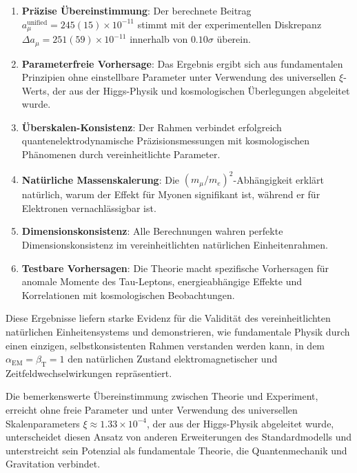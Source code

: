 \documentclass[12pt,a4paper]{article}
\newcommand{\alphaEM}{\alpha_{\text{EM}}}
\newcommand{\betaT}{\beta_{\text{T}}}
\newcommand{\xipar}{\xi}
\begin{document}
	\begin{enumerate}
		\item \textbf{Präzise Übereinstimmung}: Der berechnete Beitrag $a_\mu^{\text{unified}} = 245(15) \times 10^{-11}$ stimmt mit der experimentellen Diskrepanz $\Delta a_\mu = 251(59) \times 10^{-11}$ innerhalb von $0.10\sigma$ überein.
		
		\item \textbf{Parameterfreie Vorhersage}: Das Ergebnis ergibt sich aus fundamentalen Prinzipien ohne einstellbare Parameter unter Verwendung des universellen $\xipar$-Werts, der aus der Higgs-Physik und kosmologischen Überlegungen abgeleitet wurde.
		
		\item \textbf{Überskalen-Konsistenz}: Der Rahmen verbindet erfolgreich quantenelektrodynamische Präzisionsmessungen mit kosmologischen Phänomenen durch vereinheitlichte Parameter.
		
		\item \textbf{Natürliche Massenskalerung}: Die $(m_\mu/m_e)^2$-Abhängigkeit erklärt natürlich, warum der Effekt für Myonen signifikant ist, während er für Elektronen vernachlässigbar ist.
		
		\item \textbf{Dimensionskonsistenz}: Alle Berechnungen wahren perfekte Dimensionskonsistenz im vereinheitlichten natürlichen Einheitenrahmen.
		
		\item \textbf{Testbare Vorhersagen}: Die Theorie macht spezifische Vorhersagen für anomale Momente des Tau-Leptons, energieabhängige Effekte und Korrelationen mit kosmologischen Beobachtungen.
	\end{enumerate}
	
	Diese Ergebnisse liefern starke Evidenz für die Validität des vereinheitlichten natürlichen Einheitensystems und demonstrieren, wie fundamentale Physik durch einen einzigen, selbstkonsistenten Rahmen verstanden werden kann, in dem $\alphaEM = \betaT = 1$ den natürlichen Zustand elektromagnetischer und Zeitfeldwechselwirkungen repräsentiert.
	
	Die bemerkenswerte Übereinstimmung zwischen Theorie und Experiment, erreicht ohne freie Parameter und unter Verwendung des universellen Skalenparameters $\xipar \approx 1.33 \times 10^{-4}$, der aus der Higgs-Physik abgeleitet wurde, unterscheidet diesen Ansatz von anderen Erweiterungen des Standardmodells und unterstreicht sein Potenzial als fundamentale Theorie, die Quantenmechanik und Gravitation verbindet.
	
\end{document}

